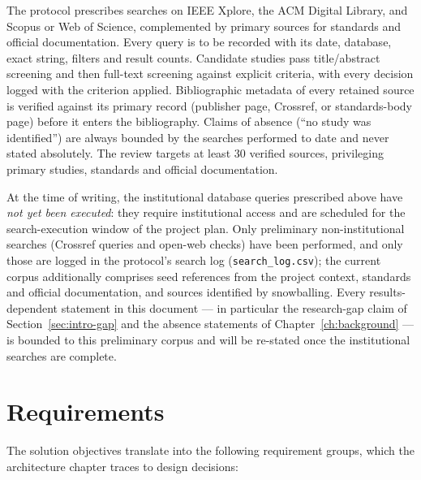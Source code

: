 The protocol prescribes searches on IEEE Xplore, the ACM Digital Library,
and Scopus or Web of Science, complemented by primary sources for standards
and official documentation. Every query is to be recorded with its date,
database, exact string, filters and result counts. Candidate studies pass
title/abstract screening and then full-text screening against explicit
criteria, with every decision logged with the criterion applied.
Bibliographic metadata of every retained source is verified against its
primary record (publisher page, Crossref, or standards-body page) before it
enters the bibliography. Claims of absence (``no study was identified'') are
always bounded by the searches performed to date and never stated
absolutely. The review targets at least 30 verified sources, privileging
primary studies, standards and official documentation.

At the time of writing, the institutional database queries prescribed above
have \emph{not yet been executed}: they require institutional access and are
scheduled for the search-execution window of the project plan. Only
preliminary non-institutional searches (Crossref queries and open-web
checks) have been performed, and only those are logged in the protocol's
search log (\texttt{search\_log.csv}); the current corpus additionally
comprises seed references from the project context, standards and official
documentation, and sources identified by snowballing. Every
results-dependent statement in this document --- in particular the
research-gap claim of Section~\ref{sec:intro-gap} and the absence statements
of Chapter~\ref{ch:background} --- is bounded to this preliminary corpus and
will be re-stated once the institutional searches are complete.

\section{Requirements}
\label{sec:method-requirements}

\noindent The solution objectives translate into the following requirement
groups, which the architecture chapter traces to design decisions:

